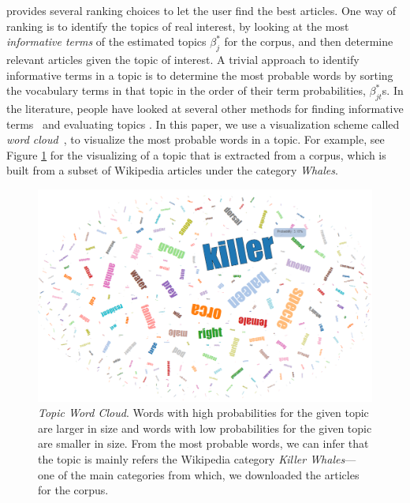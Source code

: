 \system provides several ranking choices to let the user find  
the best articles. One way of ranking is to identify the topics of 
real interest, by looking at the most \textsl{informative terms} of 
the estimated topics $\beta_j^{*}$ for the corpus, and then 
determine relevant articles given the topic of interest. A trivial 
approach to identify informative terms in a topic is to determine 
the most probable words by sorting the vocabulary terms in that 
topic in the order of their term probabilities, $\beta_{jt}^{*}$s. 
In the literature, people have looked at several other methods for 
finding informative terms~\cite{2012-termite} and evaluating topics 
\cite{mimno2011optimizing}. In this paper, we use a visualization 
scheme called \textsl{word cloud}~\cite{Davis2013}, to visualize the 
most probable words in a topic. For example, see Figure 
\ref{fig:topic-word-cloud} for the visualizing of a topic that is 
extracted from a corpus, which is built from a subset of Wikipedia 
articles under the category \textsl{Whales}. 
       
\begin{figure}[htb]\centering 
\includegraphics[width=.9\textwidth]{images/topic_visualization.png}
\caption{\textsl{Topic Word Cloud}. Words with high probabilities for the 
given topic are larger in size and words with low probabilities for 
the given topic are smaller in size. From the most probable words, 
we can infer that the topic is mainly refers the Wikipedia category 
\textit{Killer Whales}---one of the main categories from which, we 
downloaded the articles for the corpus.}
\label{fig:topic-word-cloud}
\end{figure}

